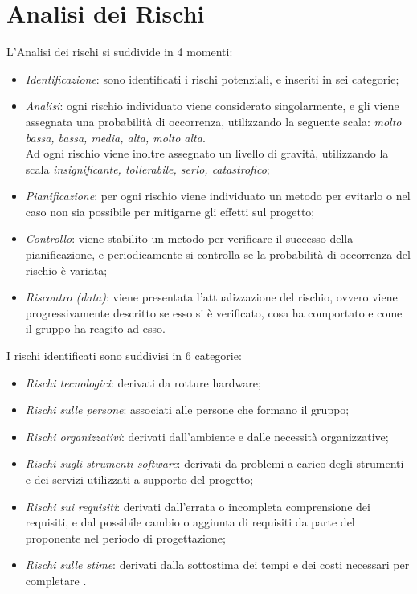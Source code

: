 \section{Analisi dei Rischi}
L'Analisi dei rischi si suddivide in 4 momenti:
\begin{itemize}
\item \textit{Identificazione}: sono identificati i rischi potenziali, e inseriti in sei categorie;
\item \textit{Analisi}: ogni rischio individuato viene considerato singolarmente, e gli viene assegnata una probabilità di occorrenza, utilizzando la seguente scala: \textit{molto bassa, bassa, media, alta, molto alta}. \\
Ad ogni rischio viene inoltre assegnato un livello di gravità, utilizzando la scala \textit{insignificante, tollerabile, serio, catastrofico};
\item \textit{Pianificazione}: per ogni rischio viene individuato un metodo per evitarlo o nel caso non sia possibile per mitigarne gli effetti sul progetto;
\item \textit{Controllo}: viene stabilito un metodo per verificare il successo della pianificazione, e periodicamente si controlla se la probabilità di occorrenza del rischio è variata;
\item \textit{Riscontro (data)}: viene presentata l'attualizzazione del rischio, ovvero viene progressivamente descritto se esso si è verificato, cosa ha comportato e come il gruppo ha reagito ad esso.
\end{itemize}

I rischi identificati sono suddivisi in 6 categorie:
\begin{itemize}
\item \textit{Rischi tecnologici}: derivati da rotture hardware;
\item \textit{Rischi sulle persone}: associati alle persone che formano il gruppo;
\item \textit{Rischi organizzativi}: derivati dall'ambiente e dalle necessità organizzative;
\item \textit{Rischi sugli strumenti software}: derivati da problemi a carico degli strumenti e dei servizi utilizzati a supporto del progetto;
\item \textit{Rischi sui requisiti}: derivati dall'errata o incompleta comprensione dei requisiti, e dal possibile cambio o aggiunta di requisiti da parte del proponente nel periodo di progettazione;
\item \textit{Rischi sulle stime}: derivati dalla sottostima dei tempi e dei costi necessari per completare \ProjectName{}.
\end{itemize}

